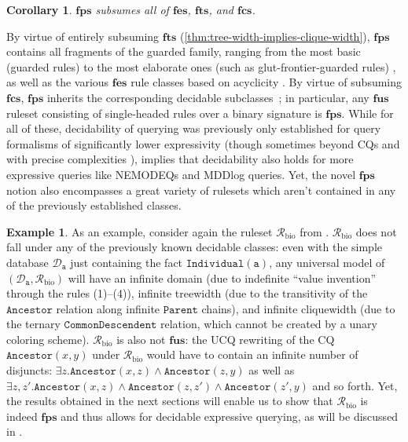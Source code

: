 \documentclass[10pt,a4paper]{amsart}
\theoremstyle{definition}
\newtheorem{exa}[exa]{Example}
\numberwithin{equation}{section}
\theoremstyle{plain}
\newtheorem{corollary}[corollary]{Corollary}
\theoremstyle{definition}
\newtheorem{example}[example]{Example}
\theoremstyle{myexample}
\renewenvironment{example}%
{
	\begin{shaded*}	
		\vspace{-1.5ex}
		\begin{exa}%
		}{
		\end{exa}
		\vspace{-1.5ex}
	\end{shaded*}
}
\theoremstyle{plain}
\theoremstyle{definition}
\newcommand{\database}{\mathcal{D}}
\newcommand{\ruleset}{\calr}
\newcommand{\bts}{\mathbf{fts}}
\newcommand{\fes}{\mathbf{fes}}
\newcommand{\fus}{\mathbf{fus}}
\newcommand{\fcs}{\mathbf{fcs}}
\newcommand{\fps}{\mathbf{fps}} %
\newcommand{\hcs}{\fps}
\newcommand{\fhcs}{\hcs}
\newcommand{\calr}{\mathcal{R}}
\newcommand{\pred}[1]{\mathtt{#1}}
\newcommand{\const}[1]{\mathtt{#1}}
\begin{document}
\begin{corollary}
$\fhcs$ subsumes all of $\fes$, $\bts$, and $\fcs$.
\end{corollary}


By virtue of entirely subsuming $\bts$ (\cref{thm:tree-width-implies-clique-width}), $\fhcs$ contains all fragments of the guarded family, ranging from the most basic (guarded rules) to the most elaborate ones (such as glut-frontier-guarded rules) \cite{BagLecMugSal11,CaliGK13,KrotzschR11}, as well as the various $\fes$ rule classes based on acyclicity \cite{GHKKMMW2013}. 
By virtue of subsuming $\fcs$, $\fhcs$ inherits the corresponding decidable subclasses~\cite{ICDT2023}; in particular, any $\fus$ ruleset consisting of single-headed rules over a binary signature is $\hcs$.
While for all of these, decidability of querying was previously only established for query formalisms of significantly lower expressivity (though sometimes beyond CQs and with precise complexities \cite{ijcai2017-110}),  implies that decidability also holds for more expressive queries like NEMODEQs and MDDlog queries. Yet, the novel $\fhcs$ notion also encompasses a great variety of rulesets which aren't contained in any of the previously established classes.

\begin{example}
As an example, consider again the ruleset $\ruleset_\mathrm{bio}$ from . $\ruleset_\mathrm{bio}$ does not fall under any of the previously known decidable classes: even with the simple database $\database_\const{a}$ just containing the fact $\pred{Individual}(\const{a})$, any universal model of $(\database_\const{a},\ruleset_\mathrm{bio})$ will have an infinite domain (due to indefinite ``value invention'' through the rules (1)--(4)), infinite treewidth (due to the transitivity of the $\pred{Ancestor}$ relation along infinite $\pred{Parent}$ chains), and infinite cliquewidth (due to the ternary $\pred{CommonDescendent}$ relation, which cannot be created by a unary coloring scheme).
%
$\ruleset_\mathrm{bio}$ is also not $\fus$: the UCQ rewriting of the CQ $\pred{Ancestor}(x,y)$ under $\ruleset_\mathrm{bio}$ would have to contain an infinite number of disjuncts: $\exists z.\pred{Ancestor}(x,z) \wedge \pred{Ancestor}(z,y)$ as well as $\exists z,z'.\pred{Ancestor}(x,z) \wedge \pred{Ancestor}(z,z')\wedge \pred{Ancestor}(z',y)$ and so forth.
%
Yet,
the results obtained in the next sections will enable us to show that $\ruleset_\mathrm{bio}$ is indeed $\fhcs$ and thus allows for decidable expressive querying, as will be discussed in .
\end{example}
\end{document}
